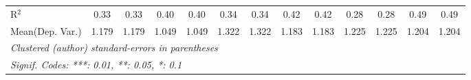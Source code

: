 \begin{tabular}{lcccccccccccc}
   R$^2$                                    & 0.33          & 0.33            & 0.40          & 0.40           & 0.34          & 0.34            & 0.42    & 0.42     & 0.28          & 0.28            & 0.49          & 0.49\\  
Mean(Dep. Var.) & 1.179 & 1.179 & 1.049 & 1.049 & 1.322 & 1.322 & 1.183 & 1.183 & 1.225 & 1.225 & 1.204 & 1.204 \\
   \midrule \midrule
   \multicolumn{13}{l}{\emph{Clustered (author) standard-errors in parentheses}}\\
   \multicolumn{13}{l}{\emph{Signif. Codes: ***: 0.01, **: 0.05, *: 0.1}}\\
\end{tabular}
\par\endgroup
